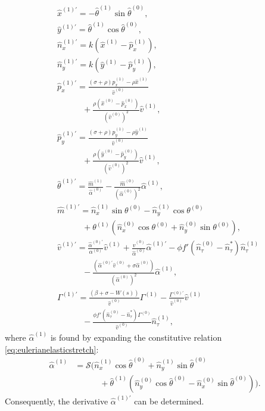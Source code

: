 \begin{align}
&\hat{x}^{(1)'} = -\hat{\theta}^{(1)}\sin\hat{\theta}^{(0)},\label{eq:xeps}\\
&\hat{y}^{(1)'} = \hat{\theta}^{(1)}\cos\hat{\theta}^{(0)},\label{eq:yeps}\\
&\hat{n}_x^{(1)'} = k(\hat{x}^{(1)} - \hat{p}^{(1)}_x),\label{eq:nxeps}\\
&\hat{n}_y^{(1)'} = k(\hat{y}^{(1)} - \hat{p}^{(1)}_y),\label{eq:nyeps}\\
&\hat{p}_x^{(1)'} = \frac{(\sigma +\rho)\hat{p}^{(1)}_x - \rho\hat{x}^{(1)}}{\hat{v}^{(0)}}\nonumber
\\&\qquad\quad+ \frac{\rho(\hat{x}^{(0)} - \hat{p}_x^{(0)})}{(\hat{v}^{(0)})^2}\hat{v}^{(1)},\label{eq:pxeps}\\
&\hat{p}_y^{(1)'} = \frac{(\sigma + \rho)\hat{p}^{(1)}_y -\rho\hat{y}^{(1)}}{\hat{v}^{(0)}}\nonumber
\\&\qquad\quad + \frac{\rho(\hat{y}^{(0)} - \hat{p}_y^{(0)})}{(\hat{v}^{(0)})^2}\hat{v}^{(1)},\label{eq:pyeps}\\
&\hat{\theta}^{(1)'} = \frac{\hat{m}^{(1)}}{\hat{\alpha}^{(0)}} - \frac{\hat{m}^{(0)}}{\left(\hat{\alpha}^{(0)}\right)^2}\hat{\alpha}^{(1)},\label{eq:thetaeps}\\
&\hat{m}^{(1)'} = \hat{n}_x^{(1)}\sin\theta^{(0)} - \hat{n}_y^{(1)}\cos\theta^{(0)}\nonumber
\\&\qquad\quad + \theta^{(1)}(\hat{n}_x^{(0)}\cos\theta^{(0)} + \hat{n}_y^{(0)}\sin\theta^{(0)}),\label{eq:meps}\\
&\hat{v}^{(1)'} = \frac{\hat{\alpha}^{(0)'}}{\alpha^{(0)}}\hat{v}^{(1)} + \frac{\hat{v}^{(0)}}{\hat{\alpha}^{(0)}}\hat{\alpha}^{(1)'}- \phi f'\left(\hat{n}^{(0)}_\tau - \hat{n}^*_\tau\right)\hat{n}^{(1)}_\tau\nonumber
\\&\qquad\quad- \frac{\left(\hat{\alpha}^{(0)'}\hat{v}^{(0)} + \sigma\hat{\alpha}^{(0)}\right)}{\left(\hat{\alpha}^{(0)}\right)^2}\hat{\alpha}^{(1)},\label{eq:veps}\\
&\Gamma^{(1)'} = \frac{(\beta + \sigma - W(s))}{\hat{v}^{(0)}}\Gamma^{(1)} - \frac{\Gamma^{(0)'}}{\hat{v}^{(0)}}\hat{v}^{(1)}\nonumber
\\&\qquad\quad- \frac{\phi f'\left(\hat{n}^{(0)}_\tau - \hat{n}^*_\tau\right)\Gamma^{(0)}}{\hat{v}^{(0)}}\hat{n}^{(1)}_\tau,\label{eq:gammaeps}
\end{align}
where $\hat{\alpha}^{(1)}$ is found by expanding the constitutive relation \eqref{eq:eulerianelasticstretch}:
\begin{align}
\hat{\alpha}^{(1)} &= \mathcal{S}\Big(\hat{n}_x^{(1)}\cos\hat{\theta}^{(0)} + \hat{n}_y^{(1)}\sin\hat{\theta}^{(0)}\nonumber
\\&\qquad\quad + \hat{\theta}^{(1)}\left(\hat{n}_y^{(0)}\cos\hat{\theta}^{(0)} - \hat{n}_x^{(0)}\sin\hat{\theta}^{(0)}\right)\Big).\label{eq:alphaeps}
\end{align}
Consequently, the derivative $\hat{\alpha}^{(1)'}$ can be determined.

